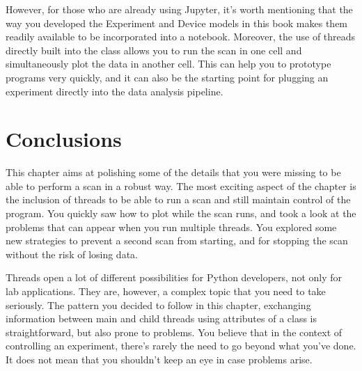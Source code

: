 However, for those who are already using Jupyter, it's worth mentioning that the way you developed the Experiment and Device models in this book makes them readily available to be incorporated into a notebook. Moreover, the use of threads directly built into the class allows you to run the scan in one cell and simultaneously plot the data in another cell. This can help you to prototype programs very quickly, and it can also be the starting point for plugging an experiment directly into the data analysis pipeline.

\section{Conclusions}\label{sec:conclusions-run-experiment}
This chapter aims at polishing some of the details that you were missing to be able to perform a scan in a robust way. The most exciting aspect of the chapter is the inclusion of threads to be able to run a scan and still maintain control of the program. You quickly saw how to plot while the scan runs, and took a look at the problems that can appear when you run multiple threads. You explored some new strategies to prevent a second scan from starting, and for stopping the scan without the risk of losing data.

Threads open a lot of different possibilities for Python developers, not only for lab applications. They are, however, a complex topic that you need to take seriously. The pattern you decided to follow in this chapter, exchanging information between main and child threads using attributes of a class is straightforward, but also prone to problems. You believe that in the context of controlling an experiment, there's rarely the need to go beyond what you've done. It does not mean that you shouldn't keep an eye in case problems arise.
